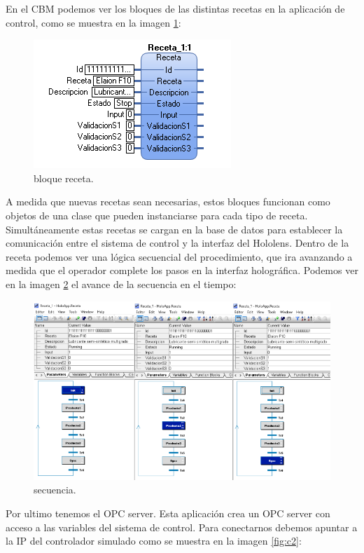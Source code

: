 En el CBM podemos ver los bloques de las distintas recetas en la aplicación de control, como se muestra en la imagen \ref{fig:c7}:

\begin{figure}[htpb]
	\centering
	\includegraphics[scale=.5]{./Figures/c7.png}
	\caption{bloque receta\protect\footnotemark.}
	\label{fig:c7}
\end{figure}

A medida que nuevas recetas sean necesarias, estos bloques funcionan como objetos de una clase que pueden instanciarse para cada tipo de receta. Simultáneamente estas recetas se cargan en la base de datos para establecer la comunicación entre el sistema de control y la interfaz del Hololens. Dentro de la receta podemos ver una lógica secuencial del procedimiento, que ira avanzando a medida que el operador complete los pasos en la interfaz holográfica. Podemos ver en la imagen \ref{fig:c123} el avance de la secuencia en el tiempo:

\begin{figure}[htpb]
	\centering
	\includegraphics[scale=.4]{./Figures/c123.png}
	\caption{secuencia\protect\footnotemark.}
	\label{fig:c123}
\end{figure}

Por ultimo tenemos el OPC server. Esta aplicación crea un OPC server con acceso a las variables del sistema de control. Para conectarnos debemos apuntar a la IP del controlador simulado como se muestra en la imagen \ref{fig:c2}:

